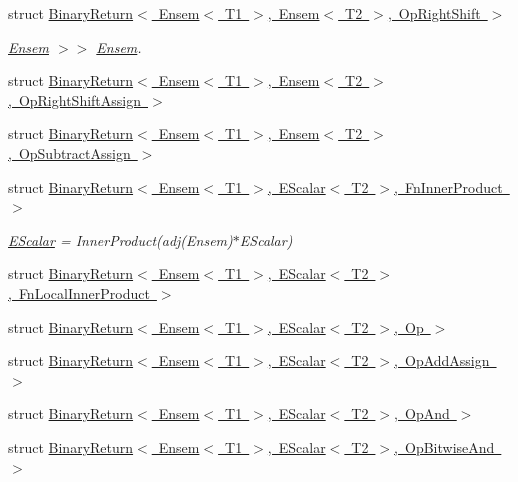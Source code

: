 \begin{DoxyCompactItemize}
\item 
struct \mbox{\hyperlink{structENSEM_1_1BinaryReturn_3_01Ensem_3_01T1_01_4_00_01Ensem_3_01T2_01_4_00_01OpRightShift_01_4}{Binary\+Return$<$ Ensem$<$ T1 $>$, Ensem$<$ T2 $>$, Op\+Right\+Shift $>$}}
\begin{DoxyCompactList}\small\item\em \mbox{\hyperlink{classENSEM_1_1Ensem}{Ensem}} $>$$>$ \mbox{\hyperlink{classENSEM_1_1Ensem}{Ensem}}. \end{DoxyCompactList}\item 
struct \mbox{\hyperlink{structENSEM_1_1BinaryReturn_3_01Ensem_3_01T1_01_4_00_01Ensem_3_01T2_01_4_00_01OpRightShiftAssign_01_4}{Binary\+Return$<$ Ensem$<$ T1 $>$, Ensem$<$ T2 $>$, Op\+Right\+Shift\+Assign $>$}}
\item 
struct \mbox{\hyperlink{structENSEM_1_1BinaryReturn_3_01Ensem_3_01T1_01_4_00_01Ensem_3_01T2_01_4_00_01OpSubtractAssign_01_4}{Binary\+Return$<$ Ensem$<$ T1 $>$, Ensem$<$ T2 $>$, Op\+Subtract\+Assign $>$}}
\item 
struct \mbox{\hyperlink{structENSEM_1_1BinaryReturn_3_01Ensem_3_01T1_01_4_00_01EScalar_3_01T2_01_4_00_01FnInnerProduct_01_4}{Binary\+Return$<$ Ensem$<$ T1 $>$, E\+Scalar$<$ T2 $>$, Fn\+Inner\+Product $>$}}
\begin{DoxyCompactList}\small\item\em \mbox{\hyperlink{classENSEM_1_1EScalar}{E\+Scalar}} = Inner\+Product(adj(\+Ensem)$\ast$\+E\+Scalar) \end{DoxyCompactList}\item 
struct \mbox{\hyperlink{structENSEM_1_1BinaryReturn_3_01Ensem_3_01T1_01_4_00_01EScalar_3_01T2_01_4_00_01FnLocalInnerProduct_01_4}{Binary\+Return$<$ Ensem$<$ T1 $>$, E\+Scalar$<$ T2 $>$, Fn\+Local\+Inner\+Product $>$}}
\item 
struct \mbox{\hyperlink{structENSEM_1_1BinaryReturn_3_01Ensem_3_01T1_01_4_00_01EScalar_3_01T2_01_4_00_01Op_01_4}{Binary\+Return$<$ Ensem$<$ T1 $>$, E\+Scalar$<$ T2 $>$, Op $>$}}
\item 
struct \mbox{\hyperlink{structENSEM_1_1BinaryReturn_3_01Ensem_3_01T1_01_4_00_01EScalar_3_01T2_01_4_00_01OpAddAssign_01_4}{Binary\+Return$<$ Ensem$<$ T1 $>$, E\+Scalar$<$ T2 $>$, Op\+Add\+Assign $>$}}
\item 
struct \mbox{\hyperlink{structENSEM_1_1BinaryReturn_3_01Ensem_3_01T1_01_4_00_01EScalar_3_01T2_01_4_00_01OpAnd_01_4}{Binary\+Return$<$ Ensem$<$ T1 $>$, E\+Scalar$<$ T2 $>$, Op\+And $>$}}
\item 
struct \mbox{\hyperlink{structENSEM_1_1BinaryReturn_3_01Ensem_3_01T1_01_4_00_01EScalar_3_01T2_01_4_00_01OpBitwiseAnd_01_4}{Binary\+Return$<$ Ensem$<$ T1 $>$, E\+Scalar$<$ T2 $>$, Op\+Bitwise\+And $>$}}

\end{DoxyCompactItemize}
